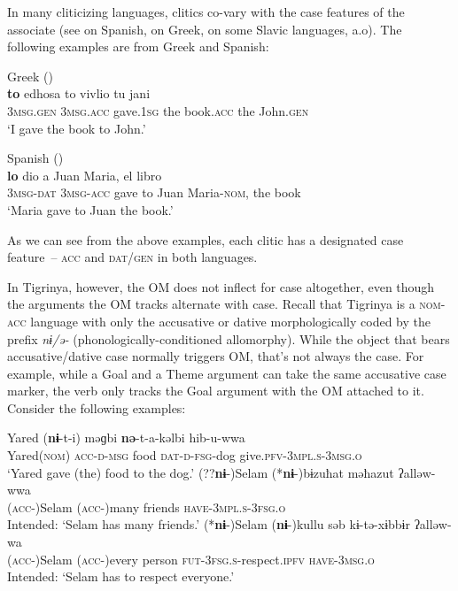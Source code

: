 \documentclass[output=paper]{langscibook}
\begin{document}
In many cliticizing languages, clitics co-vary with the case features of the associate (see \citealt{romero10} on Spanish, \citealt{ana17} on Greek, \citealt{kallulli08} on some Slavic languages, a.o). The following examples are from Greek and Spanish:

\ea
\ea Greek (\citealt{ana17})\\
 {\textbf{to}} edhosa to vivlio tu jani \\
{\scshape 3msg.gen} {\scshape 3msg.acc} gave.{\scshape 1sg} the book.{\scshape acc} the John.{\scshape gen}\\
\glt `I gave the book to John.' 

\ex Spanish (\citealt{romero10})\\
 {\textbf{lo}} dio a Juan Maria, el libro\\
{\scshape 3msg-dat} {\scshape 3msg-acc} gave to Juan Maria-{\scshape nom}, the book\\
\glt `Maria gave to Juan the book.' 
\z
\z

\noindent As we can see from the above examples, each clitic has a designated case feature~-- {\scshape acc} and {\scshape dat/gen} in both languages.

In Tigrinya, however, the OM does not inflect for case altogether, even though the arguments the OM tracks alternate with case. Recall that Tigrinya is a {\scshape nom-acc} language with only the accusative or dative morphologically coded by the prefix \textit{nɨ/ǝ-} (phonologically-conditioned allomorphy). While the object that bears accusative/dative case normally triggers OM, that's not always the case. For example, while a Goal and a Theme argument can take the same accusative case marker, the verb only tracks the Goal argument with the OM attached to it. Consider the following examples: 


\ea\label{ex:Gebregziabher:theme}
\ea\label{ex:Gebregziabher:acc} 
\gll Yared ({\textbf{nɨ}}-t-i) məɡbi {\textbf{nə}}-t-a-kəlbi hib-u-wwa \\ 
Yared({\scshape nom}) {\scshape acc-d-msg} food {\scshape dat-d-fsg}-dog  give.{\scshape pfv-3mpl.s-3msg.o} \\
\glt `Yared gave (the) food to the dog.'
\ex\label{ex:Gebregziabher:goal1} 
\gll (??{\textbf{nɨ}}-)Selam (*{\textbf{nɨ}}-)bɨzuħat məħazut  ʔalləw-wwa \\ 
({\scshape acc}-)Selam ({\scshape acc}-)many friends  {\scshape have-3mpl.s-3fsg.o} \\
\glt Intended: `Selam has many friends.'
\ex\label{ex:Gebregziabher:goal2} 
\gll (*{\textbf{nɨ}}-)Selam ({\textbf{nɨ}}-)kullu səb kɨ-tə-xɨbbɨr ʔalləw-wa \\ 
({\scshape acc}-)Selam ({\scshape acc}-)every person {\scshape fut-3fsg.s}-respect.{\scshape ipfv} {\scshape have-3msg.o} \\
\glt Intended: `Selam has to respect everyone.'
\z
\z
\end{document}
